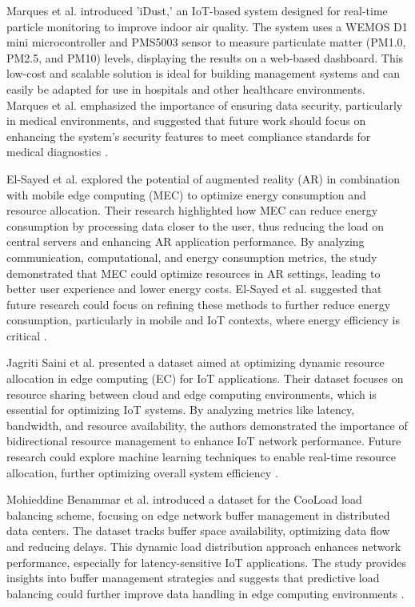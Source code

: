 Marques et al. introduced 'iDust,' an IoT-based system designed for real-time particle monitoring to improve indoor air quality. The system uses a WEMOS D1 mini microcontroller and PMS5003 sensor to measure particulate matter (PM1.0, PM2.5, and PM10) levels, displaying the results on a web-based dashboard. This low-cost and scalable solution is ideal for building management systems and can easily be adapted for use in hospitals and other healthcare environments. Marques et al. emphasized the importance of ensuring data security, particularly in medical environments, and suggested that future work should focus on enhancing the system's security features to meet compliance standards for medical diagnostics \cite{13}.

El-Sayed et al. explored the potential of augmented reality (AR) in combination with mobile edge computing (MEC) to optimize energy consumption and resource allocation. Their research highlighted how MEC can reduce energy consumption by processing data closer to the user, thus reducing the load on central servers and enhancing AR application performance. By analyzing communication, computational, and energy consumption metrics, the study demonstrated that MEC could optimize resources in AR settings, leading to better user experience and lower energy costs. El-Sayed et al. suggested that future research could focus on refining these methods to further reduce energy consumption, particularly in mobile and IoT contexts, where energy efficiency is critical \cite{14}.

Jagriti Saini et al. presented a dataset aimed at optimizing dynamic resource allocation in edge computing (EC) for IoT applications. Their dataset focuses on resource sharing between cloud and edge computing environments, which is essential for optimizing IoT systems. By analyzing metrics like latency, bandwidth, and resource availability, the authors demonstrated the importance of bidirectional resource management to enhance IoT network performance. Future research could explore machine learning techniques to enable real-time resource allocation, further optimizing overall system efficiency \cite{15}.

Mohieddine Benammar et al. introduced a dataset for the CooLoad load balancing scheme, focusing on edge network buffer management in distributed data centers. The dataset tracks buffer space availability, optimizing data flow and reducing delays. This dynamic load distribution approach enhances network performance, especially for latency-sensitive IoT applications. The study provides insights into buffer management strategies and suggests that predictive load balancing could further improve data handling in edge computing environments \cite{16}.

